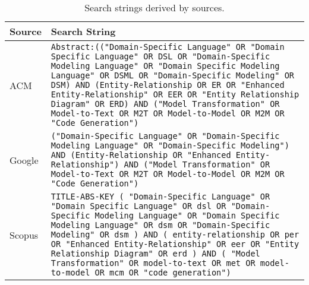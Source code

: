 \begin{table}[!htb]
\caption{Search strings derived by sources.}
\label{tab:StringsDatabases}
\tiny
\begin{tabular}{m{1.0cm}m{14.0cm}}
\bottomrule
\textbf{Source} & \textbf{Search String} \\
\hline
\T ACM & \texttt{Abstract:(("Domain-Specific Language" OR "Domain Specific Language" OR DSL OR "Domain-Specific Modeling Language" OR "Domain Specific Modeling Language" OR DSML OR "Domain-Specific Modeling" OR DSM) \linebreak AND \linebreak (Entity-Relationship OR ER OR "Enhanced Entity-Relationship" OR EER OR "Entity Relationship Diagram" OR ERD) \linebreak AND \linebreak ("Model Transformation" OR Model-to-Text OR M2T OR Model-to-Model OR M2M OR "Code Generation")} \\
\midrule
\T Google & \texttt{("Domain-Specific Language" OR "Domain-Specific Modeling Language" OR "Domain-Specific Modeling") \linebreak AND \linebreak (Entity-Relationship OR "Enhanced Entity-Relationship") \linebreak AND \linebreak ("Model Transformation" OR Model-to-Text OR M2T OR Model-to-Model OR M2M OR "Code Generation")} \\
\midrule
\T Scopus & \texttt{TITLE-ABS-KEY ( "Domain-Specific Language"  OR  "Domain Specific Language"  OR  dsl  OR  "Domain-Specific Modeling Language"  OR  "Domain Specific Modeling Language"  OR  dsm  OR  "Domain-Specific Modeling"  OR  dsm )  \linebreak AND \linebreak ( entity-relationship  OR  per  OR  "Enhanced Entity-Relationship"  OR  eer  OR  "Entity Relationship Diagram"  OR  erd ) \linebreak AND \linebreak ( "Model Transformation"  OR  model-to-text  OR  met  OR  model-to-model  OR  mcm  OR  "code generation")} \\
\midrule

\end{tabular}
\end{table}
